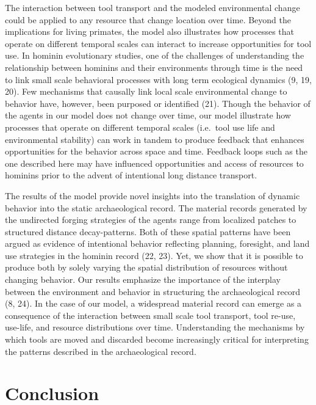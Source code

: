 \documentclass[9pt,twocolumn,twoside,]{pnas-new}
\begin{document}
The interaction between tool transport and the modeled environmental
change could be applied to any resource that change location over time.
Beyond the implications for living primates, the model also illustrates
how processes that operate on different temporal scales can interact to
increase opportunities for tool use. In hominin evolutionary studies,
one of the challenges of understanding the relationship between hominins
and their environments through time is the need to link small scale
behavioral processes with long term ecological dynamics (9, 19, 20). Few
mechanisms that causally link local scale environmental change to
behavior have, however, been purposed or identified (21). Though the
behavior of the agents in our model does not change over time, our model
illustrate how processes that operate on different temporal scales
(i.e.~tool use life and environmental stability) can work in tandem to
produce feedback that enhances opportunities for the behavior across
space and time. Feedback loops such as the one described here may have
influenced opportunities and access of resources to hominins prior to
the advent of intentional long distance transport.

The results of the model provide novel insights into the translation of
dynamic behavior into the static archaeological record. The material
records generated by the undirected forging strategies of the agents
range from localized patches to structured distance decay-patterns. Both
of these spatial patterns have been argued as evidence of intentional
behavior reflecting planning, foresight, and land use strategies in the
hominin record (22, 23). Yet, we show that it is possible to produce
both by solely varying the spatial distribution of resources without
changing behavior. Our results emphasize the importance of the interplay
between the environment and behavior in structuring the archaeological
record (8, 24). In the case of our model, a widespread material record
can emerge as a consequence of the interaction between small scale tool
transport, tool re-use, use-life, and resource distributions over time.
Understanding the mechanisms by which tools are moved and discarded
become increasingly critical for interpreting the patterns described in
the archaeological record.

\hypertarget{conclusion}{%
\section{Conclusion}\label{conclusion}}
\end{document}
